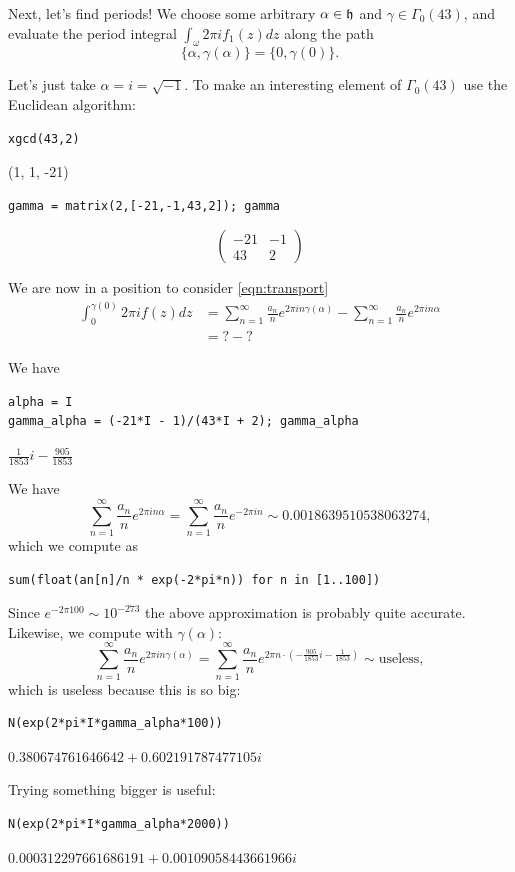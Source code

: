 \documentclass{book}
\begin{document}
Next, let's find periods!
We choose some arbitrary $\alpha\in\mathfrak{h}$ and $\gamma\in\Gamma_0(43)$,
and evaluate the period integral $\int_{\omega} 2\pi i f_1(z) dz$ along the path
$$
\{\alpha,\gamma(\alpha)\} = \{0,\gamma(0)\}.
$$

Let's just take $\alpha=i=\sqrt{-1}$.  To make an interesting
element of $\Gamma_0(43)$ use the Euclidean algorithm:
\begin{lstlisting}
xgcd(43,2)
\end{lstlisting}
(1, 1, -21)
\begin{lstlisting}
gamma = matrix(2,[-21,-1,43,2]); gamma
\end{lstlisting}
$$\left(\begin{array}{rr}
-21 & -1 \\
43 & 2
\end{array}\right)$$

We are now in a position to consider \eqref{eqn:transport}
\begin{align*}
\int_{0}^{\gamma(0)} 2\pi i f(z) dz
 &= \sum_{n=1}^{\infty}  \frac{a_n}{n} e^{2\pi i n \gamma(\alpha)} -  \sum_{n=1}^{\infty}  \frac{a_n}{n} e^{2\pi i n \alpha}\\
 &= ? - ?
\end{align*}

We have
\begin{lstlisting}
alpha = I
gamma_alpha = (-21*I - 1)/(43*I + 2); gamma_alpha
\end{lstlisting}
$
\frac{1}{1853} i - \frac{905}{1853}
$

We have
$$
\sum_{n=1}^{\infty}  \frac{a_n}{n} e^{2\pi i n\alpha}
 = \sum_{n=1}^{\infty}  \frac{a_n}{n} e^{-2\pi i n}
  \sim 0.0018639510538063274,
$$
which we compute as
\begin{lstlisting}
sum(float(an[n]/n * exp(-2*pi*n)) for n in [1..100])
\end{lstlisting}
Since
$e^{-2\pi 100} \sim 10^{-273}$
the above approximation is probably quite accurate.
Likewise, we compute with $\gamma(\alpha)$:
$$
\sum_{n=1}^{\infty}  \frac{a_n}{n} e^{2\pi i n\gamma(\alpha)}
 = \sum_{n=1}^{\infty}  \frac{a_n}{n} e^{2\pi n \cdot \left(-\frac{905}{1853} i - \frac{1}{1853}\right)}
  \sim \text{useless},
$$
which is useless because this is so big:
\begin{lstlisting}
N(exp(2*pi*I*gamma_alpha*100))
\end{lstlisting}
$0.380674761646642 + 0.602191787477105i$

Trying something bigger is useful:
\begin{lstlisting}
N(exp(2*pi*I*gamma_alpha*2000))
\end{lstlisting}
$0.000312297661686191 + 0.00109058443661966i$
\end{document}
